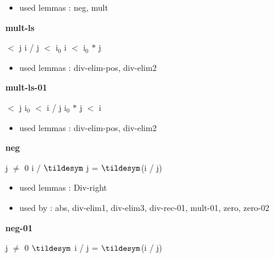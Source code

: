 \documentclass[a4paper]{article}
\begin{document}
\begin{itemize}


\item       used lemmas  : neg, mult

\end{itemize}

\medskip

\bigskip

{\large\bf mult-ls}

\medskip

  $<$ j \And i / j $<$ $\mbox{i}_{0}$ \Imp i $<$ $\mbox{i}_{0}$ $*$ j

\begin{itemize}


\item       used lemmas  : div-elim-pos, div-elim2

\end{itemize}

\medskip

\bigskip

{\large\bf mult-ls-01}

\medskip

  $<$ j \And $\mbox{i}_{0}$ $<$ i / j \Imp $\mbox{i}_{0}$ $*$ j $<$ i

\begin{itemize}


\item       used lemmas  : div-elim-pos, div-elim2

\end{itemize}

\medskip

\bigskip

{\large\bf neg}

\medskip

j $\neq$ 0 \Fol i / $\tildesym$ j = $\tildesym$(i / j)

\begin{itemize}


\item       used lemmas  : Div-right
\item       used by      : abs, div-elim1, div-elim3, div-rec-01, mult-01, zero, zero-02

\end{itemize}

\medskip

\bigskip

{\large\bf neg-01}

\medskip

j $\neq$ 0 \Fol $\tildesym$ i / j = $\tildesym$(i / j)
\end{document}
